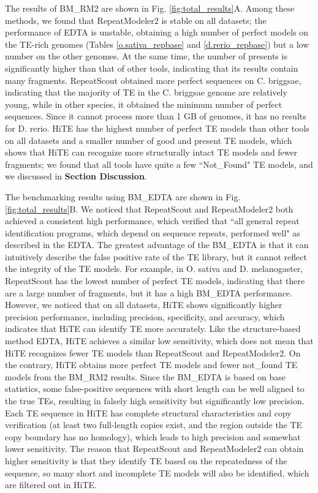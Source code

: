 \documentclass{bmcart}
\begin{document}
The results of BM\_RM2 are shown in Fig. \ref{fig:total_results}A. Among these methods, we found that RepeatModeler2 is stable on all datasets; the performance of EDTA is unstable, obtaining a high number of perfect models on the TE-rich genomes (Tables \ref{o.sativa_repbase} and \ref{d.rerio_repbase}) but a low number on the other genomes. At the same time, the number of presents is significantly higher than that of other tools, indicating that its results contain many fragments. RepeatScout obtained more perfect sequences on C. briggsae, indicating that the majority of TE in the C. briggsae genome are relatively young, while in other species, it obtained the minimum number of perfect sequences. Since it cannot process more than 1 GB of genomes, it has no results for D. rerio. HiTE has the highest number of perfect TE models than other tools on all datasets and a smaller number of good and present TE models, which shows that HiTE can recognize more structurally intact TE models and fewer fragments; we found that all tools have quite a few ``Not\_Found" TE models, and we discussed in \textbf{Section Discussion}.

The benchmarking results using BM\_EDTA are shown in Fig. \ref{fig:total_results}B. We noticed that RepeatScout and RepeatModeler2 both achieved a consistent high performance, which verified that ``all general repeat identification programs, which depend on sequence repeats, performed well" as described in the EDTA\cite{ou2019benchmarking}. The greatest advantage of the BM\_EDTA is that it can intuitively describe the false positive rate of the TE library, but it cannot reflect the integrity of the TE models. For example, in O. sativa and D. melanogaster, RepeatScout has the lowest number of perfect TE models, indicating that there are a large number of fragments, but it has a high BM\_EDTA performance. However, we noticed that on all datasets, HiTE shows significantly higher precision performance, including precision, specificity, and accuracy, which indicates that HiTE can identify TE more accurately. Like the structure-based method EDTA, HiTE achieves a similar low sensitivity, which does not mean that HiTE recognizes fewer TE models than RepeatScout and RepeatModeler2. On the contrary, HiTE obtains more perfect TE models and fewer not\_found TE models from the BM\_RM2 results. 
Since the BM\_EDTA is based on base statistics, some false-positive sequences with short length can be well aligned to the true TEs, resulting in falsely high sensitivity but significantly low precision. Each TE sequence in HiTE has complete structural characteristics and copy verification (at least two full-length copies exist, and the region outside the TE copy boundary has no homology), which leads to high precision and somewhat lower sensitivity.
The reason that RepeatScout and RepeatModeler2 can obtain higher sensitivity is that they identify TE based on the repeatedness of the sequence, so many short and incomplete TE models will also be identified, which are filtered out in HiTE.
\end{document}
